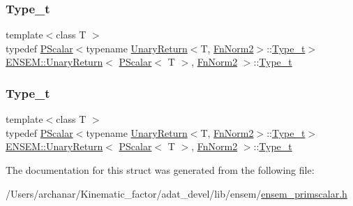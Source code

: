 \subsubsection{\texorpdfstring{Type\_t}{Type\_t}\hspace{0.1cm}{\footnotesize\ttfamily [1/2]}}
{\footnotesize\ttfamily template$<$class T $>$ \\
typedef \mbox{\hyperlink{classENSEM_1_1PScalar}{P\+Scalar}}$<$typename \mbox{\hyperlink{structENSEM_1_1UnaryReturn}{Unary\+Return}}$<$T, \mbox{\hyperlink{structENSEM_1_1FnNorm2}{Fn\+Norm2}}$>$\+::\mbox{\hyperlink{structENSEM_1_1UnaryReturn_3_01PScalar_3_01T_01_4_00_01FnNorm2_01_4_a668c493a2fae41d6416ca55cc046b6b5}{Type\+\_\+t}}$>$ \mbox{\hyperlink{structENSEM_1_1UnaryReturn}{E\+N\+S\+E\+M\+::\+Unary\+Return}}$<$ \mbox{\hyperlink{classENSEM_1_1PScalar}{P\+Scalar}}$<$ T $>$, \mbox{\hyperlink{structENSEM_1_1FnNorm2}{Fn\+Norm2}} $>$\+::\mbox{\hyperlink{structENSEM_1_1UnaryReturn_3_01PScalar_3_01T_01_4_00_01FnNorm2_01_4_a668c493a2fae41d6416ca55cc046b6b5}{Type\+\_\+t}}}

\mbox{\label{structENSEM_1_1UnaryReturn_3_01PScalar_3_01T_01_4_00_01FnNorm2_01_4_a668c493a2fae41d6416ca55cc046b6b5}} 
\subsubsection{\texorpdfstring{Type\_t}{Type\_t}\hspace{0.1cm}{\footnotesize\ttfamily [2/2]}}
{\footnotesize\ttfamily template$<$class T $>$ \\
typedef \mbox{\hyperlink{classENSEM_1_1PScalar}{P\+Scalar}}$<$typename \mbox{\hyperlink{structENSEM_1_1UnaryReturn}{Unary\+Return}}$<$T, \mbox{\hyperlink{structENSEM_1_1FnNorm2}{Fn\+Norm2}}$>$\+::\mbox{\hyperlink{structENSEM_1_1UnaryReturn_3_01PScalar_3_01T_01_4_00_01FnNorm2_01_4_a668c493a2fae41d6416ca55cc046b6b5}{Type\+\_\+t}}$>$ \mbox{\hyperlink{structENSEM_1_1UnaryReturn}{E\+N\+S\+E\+M\+::\+Unary\+Return}}$<$ \mbox{\hyperlink{classENSEM_1_1PScalar}{P\+Scalar}}$<$ T $>$, \mbox{\hyperlink{structENSEM_1_1FnNorm2}{Fn\+Norm2}} $>$\+::\mbox{\hyperlink{structENSEM_1_1UnaryReturn_3_01PScalar_3_01T_01_4_00_01FnNorm2_01_4_a668c493a2fae41d6416ca55cc046b6b5}{Type\+\_\+t}}}



The documentation for this struct was generated from the following file\+:\begin{DoxyCompactItemize}
\item 
/\+Users/archanar/\+Kinematic\+\_\+factor/adat\+\_\+devel/lib/ensem/\mbox{\hyperlink{lib_2ensem_2ensem__primscalar_8h}{ensem\+\_\+primscalar.\+h}}\end{DoxyCompactItemize}
